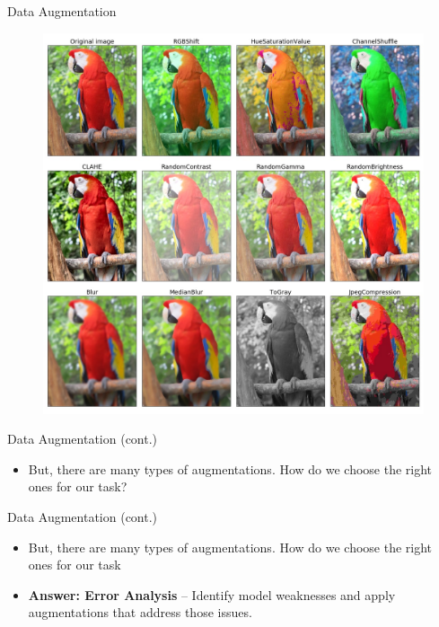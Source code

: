 \begin{frame}[allowframebreaks]{Data Augmentation}
\begin{figure}
    \includegraphics[width=.8\textwidth,height=.8\textheight,keepaspectratio]{images/augmentation_new.jpg}
    \end{figure}
\end{frame}

\begin{frame}{Data Augmentation (cont.)}
\begin{itemize}
    \item But, there are many types of augmentations. How do we choose the right ones for our task?
\end{itemize}
\end{frame}

\begin{frame}{Data Augmentation (cont.)}
\begin{itemize}
    \item But, there are many types of augmentations. How do we choose the right ones for our task
    \item \textbf{Answer: Error Analysis} – Identify model weaknesses and apply augmentations that address those issues.
\end{itemize}
\end{frame}


